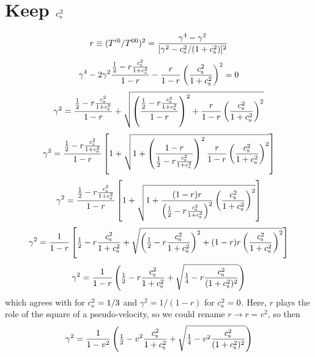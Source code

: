 \documentclass[twocolumn]{article}
\begin{document}
\section{Keep $c_{\rm s}^2$}

\begin{equation}
r\equiv(T^{i0}/T^{00})^2={\gamma^4-\gamma^2\over[\gamma^2-c_{\rm s}^2/(1+c_{\rm s}^2)]^2}
\end{equation}
\begin{equation}
\gamma^4-2\gamma^2\frac{{\textstyle{1\over2}}-r\frac{c_{\rm s}^2}{1+c_{\rm s}^2}}{1-r}-\frac{r}{1-r}\left(\frac{c_{\rm s}^2}{1+c_{\rm s}^2}\right)^2=0
\end{equation}
\begin{equation}
\gamma^2=\frac{{\textstyle{1\over2}}-r\frac{c_{\rm s}^2}{1+c_{\rm s}^2}}{1-r}
+\sqrt{\left(\frac{{\textstyle{1\over2}}-r\frac{c_{\rm s}^2}{1+c_{\rm s}^2}}{1-r}\right)^2
+\frac{r}{1-r}\left(\frac{c_{\rm s}^2}{1+c_{\rm s}^2}\right)^2}
\end{equation}
\begin{equation}
\gamma^2=\frac{{\textstyle{1\over2}}-r\frac{c_{\rm s}^2}{1+c_{\rm s}^2}}{1-r}
\left[1+\sqrt{1
+\left(\frac{1-r}{{\textstyle{1\over2}}-r\frac{c_{\rm s}^2}{1+c_{\rm s}^2}}\right)^2
\frac{r}{1-r}\left(\frac{c_{\rm s}^2}{1+c_{\rm s}^2}\right)^2}\right]
\end{equation}
\begin{equation}
\gamma^2=\frac{{\textstyle{1\over2}}-r\frac{c_{\rm s}^2}{1+c_{\rm s}^2}}{1-r}
\left[1+\sqrt{1
+\frac{(1-r)r}{\left({\textstyle{1\over2}}-r\frac{c_{\rm s}^2}{1+c_{\rm s}^2}\right)^2}
\left(\frac{c_{\rm s}^2}{1+c_{\rm s}^2}\right)^2}\right]
\end{equation}
\begin{equation}
\gamma^2=\frac{1}{1-r}
\left[{\textstyle{1\over2}}-r\frac{c_{\rm s}^2}{1+c_{\rm s}^2}+\sqrt{\left({\textstyle{1\over2}}-r\frac{c_{\rm s}^2}{1+c_{\rm s}^2}\right)^2
+(1-r)r\left(\frac{c_{\rm s}^2}{1+c_{\rm s}^2}\right)^2}\right]
\end{equation}
\begin{equation}
\gamma^2=\frac{1}{1-r}
\left({\textstyle{1\over2}}-r\frac{c_{\rm s}^2}{1+c_{\rm s}^2}+\sqrt{{\textstyle{1\over4}}-r\frac{c_{\rm s}^2}{(1+c_{\rm s}^2)^2}}\right)
\end{equation}
which agrees with  for $c_{\rm s}^2=1/3$ and $\gamma^2=1/(1-r)$ for $c_{\rm s}^2=0$.
Here, $r$ plays the role of the square of a pseudo-velocity, so we could rename
$r\to r=v^2$, so then
\begin{equation}
\gamma^2=\frac{1}{1-v^2}
\left({\textstyle{1\over2}}-v^2\frac{c_{\rm s}^2}{1+c_{\rm s}^2}+\sqrt{{\textstyle{1\over4}}-v^2\frac{c_{\rm s}^2}{(1+c_{\rm s}^2)^2}}\right)
\label{gamma2eqn}
\end{equation}
\end{document}
